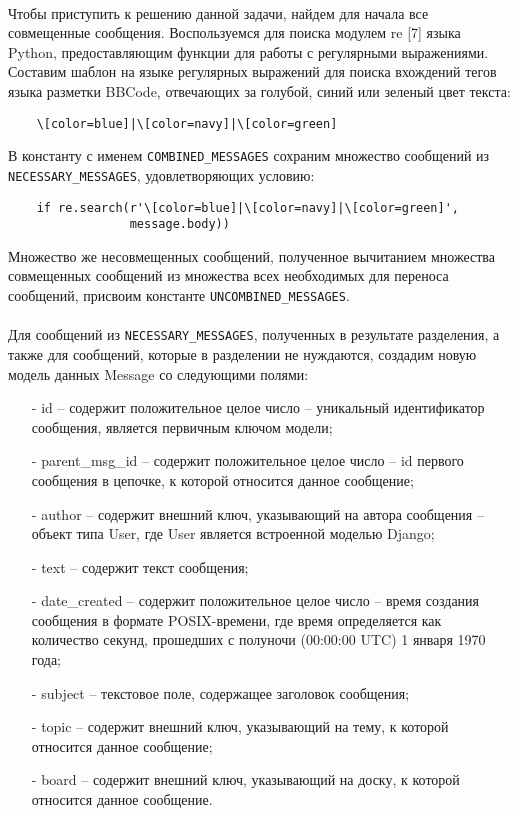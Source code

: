 \documentclass[12pt, a4paper, oneside]{article}
\begin{document}
\paragraph{}
Чтобы приступить к решению данной задачи, найдем для начала все совмещенные сообщения. Воспользуемся для поиска модулем re [7] языка Python, предоставляющим функции для работы с регулярными выражениями. Составим шаблон на языке регулярных выражений для поиска вхождений тегов языка разметки BBCode, отвечающих за голубой, синий или зеленый цвет текста:
\begin{verbatim}
    \[color=blue]|\[color=navy]|\[color=green]
\end{verbatim}
В константу с именем \texttt{COMBINED\_MESSAGES} сохраним множество сообщений из \texttt{NECESSARY\_MESSAGES}, удовлетворяющих условию:
\begin{verbatim}
    if re.search(r'\[color=blue]|\[color=navy]|\[color=green]', 
                 message.body))
\end{verbatim}
Множество же несовмещенных сообщений, полученное вычитанием множества совмещенных сообщений из множества всех необходимых для переноса сообщений, присвоим константе \texttt{UNCOMBINED\_MESSAGES}.
\paragraph{}
Для сообщений из \texttt{NECESSARY\_MESSAGES}, полученных в результате разделения, а также для сообщений, которые в разделении не нуждаются, создадим новую модель данных Message со следующими полями:
\begin{itemize}
    \item[-] id – содержит положительное целое число – уникальный идентификатор сообщения, является первичным ключом модели;
    \item[-] parent\_msg\_id – содержит положительное целое число – id первого сообщения в цепочке, к которой относится данное сообщение;
    \item[-] author – содержит внешний ключ, указывающий на автора сообщения – объект типа User, где User является встроенной моделью Django;
    \item[-] text – содержит текст сообщения;
    \item[-] date\_created – содержит положительное целое число – время создания сообщения в формате POSIX-времени, где время определяется как количество секунд, прошедших с полуночи (00:00:00 UTC) 1 января 1970 года;
    \item[-] subject – текстовое поле, содержащее заголовок сообщения;
    \item[-] topic – содержит внешний ключ, указывающий на тему, к которой относится данное сообщение;
    \item[-] board – содержит внешний ключ, указывающий на доску, к которой относится данное сообщение.
\end{itemize}
\end{document}
